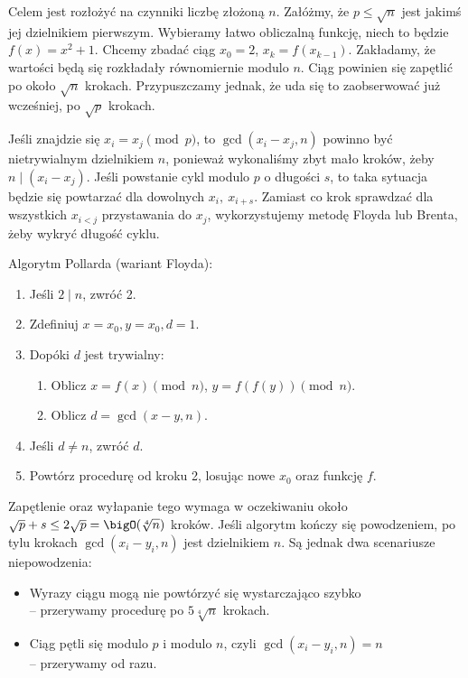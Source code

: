 Celem jest rozłożyć na czynniki liczbę złożoną \( n \). Załóżmy, że \( p \leq \sqrt{n} \) jest jakimś jej dzielnikiem pierwszym.
Wybieramy łatwo obliczalną funkcję, niech to będzie \( f(x) = x^2 + 1 \). Chcemy zbadać ciąg \( x_0 = 2 \), \( x_k = f(x_{k-1}) \).
Zakładamy, że wartości będą się rozkładały równomiernie modulo \( n \). Ciąg powinien się zapętlić po około \( \sqrt{n} \) krokach. Przypuszczamy jednak, że uda się to zaobserwować już wcześniej, po \( \sqrt{p} \) krokach.

Jeśli znajdzie się \( x_i = x_j \pmod{p} \), to \( \gcd(x_i - x_j, n) \) powinno być nietrywialnym dzielnikiem \( n \), ponieważ wykonaliśmy zbyt mało kroków, żeby \( n \mid (x_i - x_j) \).
Jeśli powstanie cykl modulo \( p \) o długości \( s \), to taka sytuacja będzie się powtarzać dla dowolnych \( x_i, \ x_{i+s} \). Zamiast co krok sprawdzać dla wszystkich \( x_{i<j} \) przystawania do \( x_j \),
wykorzystujemy metodę Floyda lub Brenta, żeby wykryć długość cyklu.
\begin{greyframe}
    Algorytm Pollarda (wariant Floyda):
    \begin{enumerate}
        \item Jeśli \( 2 \mid n \), zwróć 2.
        \item Zdefiniuj \( x = x_0, y = x_0, d = 1 \).
        \item Dopóki \( d \) jest trywialny:
        \begin{enumerate}
            \item Oblicz \( x = f(x) \pmod{n} \), \( y = f(f(y)) \pmod{n} \).
            \item Oblicz \( d = \gcd(x-y, n) \).
        \end{enumerate}
        \item Jeśli \( d \neq n \), zwróć \( d \).
        \item Powtórz procedurę od kroku 2, losując nowe \( x_0 \) oraz funkcję \( f \).
    \end{enumerate}
\end{greyframe}
Zapętlenie oraz wyłapanie tego wymaga w oczekiwaniu około \( \sqrt{p} + s \leq 2\sqrt{p} = \bigO(\sqrt[4]{n}) \) kroków. Jeśli algorytm kończy się powodzeniem, po tylu krokach \( \gcd(x_i - y_i, n )\) jest dzielnikiem \( n \).
Są jednak dwa scenariusze niepowodzenia:
\begin{itemize}
    \item Wyrazy ciągu mogą nie powtórzyć się wystarczająco szybko \\
    -- przerywamy procedurę po \( 5\sqrt[4]{n} \) krokach.
    \item Ciąg pętli się modulo \( p \) i modulo \( n \), czyli \( \gcd(x_i - y_i, n) = n \) \\
    -- przerywamy od razu.
\end{itemize}

